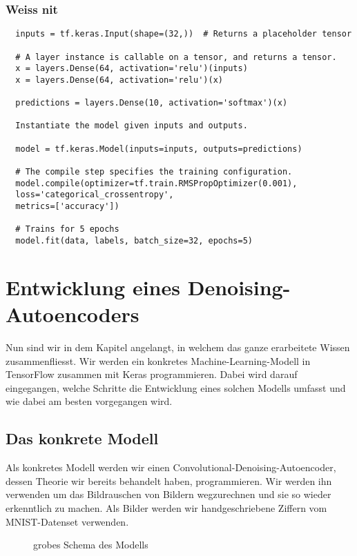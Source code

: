 \subsection{Weiss nit}

\begin{verbatim}
  inputs = tf.keras.Input(shape=(32,))  # Returns a placeholder tensor

  # A layer instance is callable on a tensor, and returns a tensor.
  x = layers.Dense(64, activation='relu')(inputs)
  x = layers.Dense(64, activation='relu')(x)

  predictions = layers.Dense(10, activation='softmax')(x)

  Instantiate the model given inputs and outputs.

  model = tf.keras.Model(inputs=inputs, outputs=predictions)

  # The compile step specifies the training configuration.
  model.compile(optimizer=tf.train.RMSPropOptimizer(0.001),
  loss='categorical_crossentropy',
  metrics=['accuracy'])

  # Trains for 5 epochs
  model.fit(data, labels, batch_size=32, epochs=5)
\end{verbatim}



\chapter{Entwicklung eines Denoising-Autoencoders}
Nun sind wir in dem Kapitel angelangt, in welchem das ganze erarbeitete Wissen
zusammenfliesst. Wir werden ein konkretes Machine-Learning-Modell in TensorFlow
zusammen mit Keras programmieren. Dabei wird darauf eingegangen, welche Schritte die
Entwicklung eines solchen Modells umfasst und wie dabei am besten vorgegangen
wird.

\section{Das konkrete Modell}
Als konkretes Modell werden wir einen Convolutional-Denoising-Autoencoder,
dessen Theorie wir bereits behandelt haben, programmieren.
Wir werden ihn verwenden um das Bildrauschen von Bildern wegzurechnen und sie so
wieder erkenntlich zu machen. Als
Bilder werden wir handgeschriebene Ziffern vom MNIST-Datenset verwenden.

\begin{figure}
  \caption{grobes Schema des Modells}
\end{figure}

